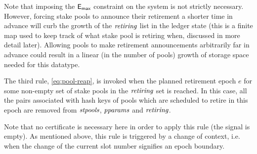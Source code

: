Note that imposing the $\mathsf{E_{max}}$ constraint on the system is not strictly necessary.
However, forcing stake pools to announce their retirement a shorter time in
advance will curb the growth of the $\mathit{retiring}$ list in the ledger state
(this is a finite map used to keep track of what stake pool is retiring when,
discussed in more detail later).
Allowing pools to make retirement announcements arbitrarily far in advance
could result in a linear (in the number of pools) growth of storage space needed
for this datatype.

The third rule, \cref{eq:pool-reap}, is invoked when the planned retirement epoch
$e$ for some non-empty set of
stake pools in the $\mathit{retiring}$ set is reached. In this case, all the
pairs associated with hash keys of pools which are scheduled to retire in this
epoch are removed
from $\mathit{stpools}$, $\mathit{pparams}$ and $\mathit{retiring}$.

Note that no certificate is
necessary here in order to apply this rule (the signal is empty). As mentioned
above, this rule is triggered by a change of context, i.e. when the change
of the current slot number signifies an epoch boundary.

